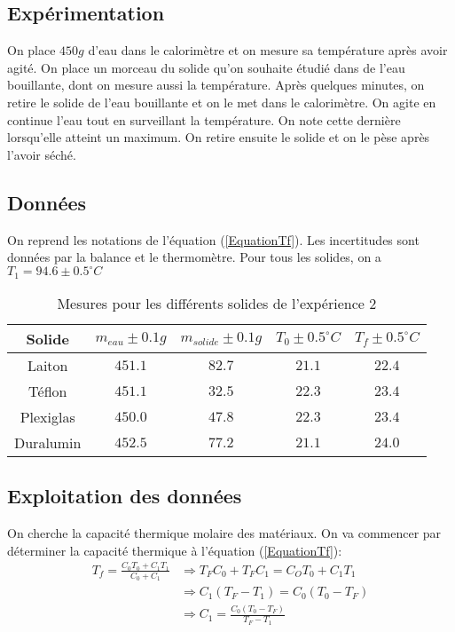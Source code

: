 \documentclass[12pt]{article}
\begin{document}
\subsection{Expérimentation}
On place $450g$ d'eau dans le calorimètre et on mesure sa température après avoir agité. On place un morceau du solide qu'on souhaite étudié dans de l'eau bouillante, dont on mesure aussi la température. Après quelques minutes, on retire le solide de l'eau bouillante et on le met dans le calorimètre. On agite en continue l'eau tout en surveillant la température. On note cette dernière lorsqu'elle atteint un maximum. On retire ensuite le solide et on le pèse après l'avoir séché.

\subsection{Données}
On reprend les notations de l'équation (\ref{EquationTf}). Les incertitudes sont données par la balance et le thermomètre. Pour tous les solides, on a $T_1=94.6\pm 0.5^{\circ}C$
\begin{table}[h!]
	\begin{center}
		\begin{tabular}{|c|c|c|c|c|}
		\hline
		Solide & $m_{eau} \pm 0.1g$ & $m_{solide}\pm 0.1g$ & $T_0\pm 0.5^{\circ}C$ & $T_f\pm 0.5^{\circ}C$\\ \hline
		Laiton & $451.1$ & $82.7$ & $21.1$ & $22.4$ \\
		Téflon & $451.1$ & $32.5$ & $22.3$ & $23.4$ \\
		Plexiglas & $450.0$ & $47.8$ & $22.3$ & $23.4$ \\
		Duralumin & $452.5$ & $77.2$ & $21.1$ & $24.0$ \\ \hline
		\end{tabular}
		\caption{Mesures pour les différents solides de l'expérience 2}
		\label{table:mesureexp2}
	\end{center}
\end{table}

\subsection{Exploitation des données}
On cherche la capacité thermique molaire des matériaux. On va commencer par déterminer la capacité thermique  à l'équation (\ref{EquationTf}):
\begin{align*}
T_f=\frac{C_0T_0+C_1T_1}{C_0+C_1} &\Rightarrow T_FC_0+T_FC_1=C_OT_0+C_1T_1 \\
&\Rightarrow C_1(T_F-T_1)=C_0(T_0-T_F) \\
&\Rightarrow C_1=\frac{C_0(T_0-T_F)}{T_F-T_1}
\end{align*}
\end{document}
